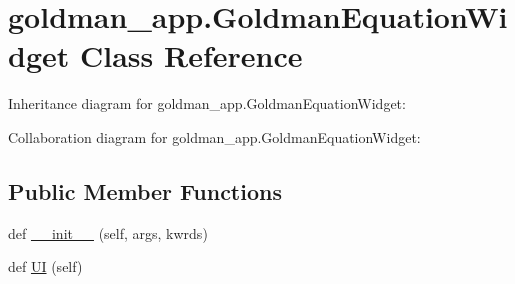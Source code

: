 \hypertarget{classgoldman__app_1_1GoldmanEquationWidget}{}\section{goldman\+\_\+app.\+Goldman\+Equation\+Widget Class Reference}
\label{classgoldman__app_1_1GoldmanEquationWidget}


Inheritance diagram for goldman\+\_\+app.\+Goldman\+Equation\+Widget\+:


Collaboration diagram for goldman\+\_\+app.\+Goldman\+Equation\+Widget\+:
\subsection*{Public Member Functions}
\begin{DoxyCompactItemize}
\item 
def \hyperlink{classgoldman__app_1_1GoldmanEquationWidget_a015580c938c202b85775786affbe6914}{\+\_\+\+\_\+init\+\_\+\+\_\+} (self, args, kwrds)
\item 
def \hyperlink{classgoldman__app_1_1GoldmanEquationWidget_a0366838001fc830f1075d78ffd3c99c2}{UI} (self)
\end{DoxyCompactItemize}
